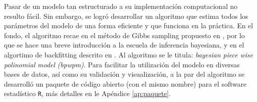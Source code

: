 \documentclass[../Main/Main.tex]{subfiles}
\begin{document}
Pasar de un modelo tan estructurado a su implementación computacional no resulto fácil. Sin embargo, se logró desarrollar un algoritmo que estima todos los parámetros del modelo de una forma eficiente y que funciona en la práctica. En el fondo, el algoritmo recae en el método de Gibbs sampling propuesto en \citet{albert1993bayesian}, por lo que se hace una breve introducción a la escuela de inferencia bayesiana, y en el algortimo de backfitting descrito en \citet{hastie1986generalized}. Al algoritmo se le titula: \textit{bayesian piece wise polinomial model (bpwpm)}. Para facilitar la utilización del modelo en diversas bases de datos, así como  su validación y visualización, a la par del algoritmo se desarrolló un paquete de código abierto (con el mismo nombre) para el software estadístico \verb|R|, más detalles en le Apéndice \ref{ap:paquete}.
\end{document}
